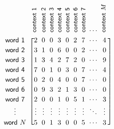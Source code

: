 
\begin{figure}[ht!]
	\centering
	\[\arraycolsep=1.8pt\def\arraystretch{1.2}
	\begin{blockarray}{c@{\hspace{4mm}}c@{\hspace{2mm}}c@{\hspace{2mm}}c@{\hspace{2mm}}c@{\hspace{2mm}}c@{\hspace{2mm}}c@{\hspace{2mm}}c@{\hspace{2mm}}c@{\hspace{2mm}}c}
		& ~~\rot{\textsf{\small{context 1}}} & \rot{\textsf{\small{context 2}}} & \rot{\textsf{\small{context 3}}} & \rot{\textsf{\small{context 4}}} & \rot{\textsf{\small{context 5}}} & \rot{\textsf{\small{context 6}}} & \rot{\textsf{\small{context 7}}} & \small{\cdots} & \rot{\small{\textsf{context}} $M$}~ \\
		\begin{block}{c[@{\hspace{4mm}}c@{\hspace{2mm}}c@{\hspace{2mm}}c@{\hspace{2mm}}c@{\hspace{2mm}}c@{\hspace{2mm}}c@{\hspace{2mm}}c@{\hspace{2mm}}c@{\hspace{2mm}}c]}
			\textsf{word 1} & 2 & 0 & 0 & 3 & 0 & 2 & 7 & \cdots & 4 \\
			\textsf{word 2} & 3 & 1 & 0 & 6 & 0 & 0 & 2 & \cdots & 0 \\
			\textsf{word 3} & 1 & 3 & 4 & 2 & 7 & 2 & 0 & \cdots & 9 \\
			\textsf{word 4} & 7 & 0 & 1 & 0 & 3 & 0 & 7 & \cdots & 4 \\
			\textsf{word 5} & 0 & 2 & 0 & 4 & 0 & 0 & 7 & \cdots & 0 \\
			\textsf{word 6} & 0 & 9 & 3 & 2 & 1 & 3 & 0 & \cdots & 0 \\	
			\textsf{word 7} & 2 & 0 & 0 & 1 & 0 & 5 & 1 & \cdots & 3 \\	
			\vdots & \vdots & \vdots & \vdots & \vdots & \vdots & \vdots & \vdots & \ddots & \vdots \\	
			\textsf{word~}N & 5 & 0 & 1 & 3 & 0 & 0 & 5 & \cdots & 3 \\
		\end{block}

\end{blockarray}\]
\end{figure}
